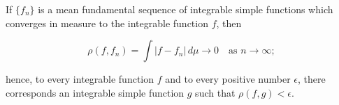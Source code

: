 If $\{f_n\}$ is a mean fundamental sequence of integrable simple functions which converges in measure to the integrable function $f$, then

$$\rho(f, f_n) = \int |f - f_n| \, d\mu \to 0 \quad \text{as } n \to \infty;$$

hence, to every integrable function $f$ and to every positive number $\epsilon$, there corresponds an integrable simple function $g$ such that $\rho(f, g) < \epsilon$.
